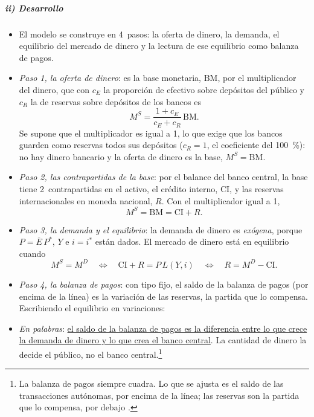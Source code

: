 \documentclass[11pt]{article}
\begin{document}
\subparagraph{ii) Desarrollo}

\begin{itemize}
\item El modelo se construye en 4~pasos: la oferta de dinero, la demanda, el equilibrio del mercado de dinero y la lectura de ese equilibrio como balanza de pagos.
\item \emph{Paso 1, la oferta de dinero}: es la base monetaria, $\mathrm{BM}$, por el multiplicador del dinero, que con $c_E$ la proporción de efectivo sobre depósitos del público y $c_R$ la de reservas sobre depósitos de los bancos es 
  \begin{equation}\label{eq:multiplicador-dinero}
  M^S=\frac{1+c_E}{c_E+c_R}\,\mathrm{BM} .
  \end{equation}
  Se supone que el multiplicador es igual a 1, lo que exige que los bancos guarden como reservas todos sus depósitos ($c_R=1$, el coeficiente del 100~\%): no hay dinero bancario y la oferta de dinero es la base, $M^S=\mathrm{BM}$.
\item \emph{Paso 2, las contrapartidas de la base}: por el balance del banco central, la base tiene 2~contrapartidas en el activo, el crédito interno, $\mathrm{CI}$, y las reservas internacionales en moneda nacional, $R$. Con el multiplicador igual a 1,
  \begin{equation}\label{eq:oferta-monetaria}
  M^S=\mathrm{BM}=\mathrm{CI}+R .
  \end{equation}
\item \emph{Paso 3, la demanda y el equilibrio}: la demanda de dinero es \emph{exógena}, porque $P=\overline E\,P^*$, $Y$ e $i=i^*$ están dados. El mercado de dinero está en equilibrio cuando
  \[
  M^S=M^D\quad\Longleftrightarrow\quad\mathrm{CI}+R=P\,L(Y,i)\quad\Longleftrightarrow\quad R=M^D-\mathrm{CI}.
  \]
\item \emph{Paso 4, la balanza de pagos}: con tipo fijo, el saldo de la balanza de pagos (por encima de la línea) es la variación de las reservas, la partida que lo compensa. Escribiendo el equilibrio en variaciones:
\item \emph{En palabras}: \uline{el saldo de la balanza de pagos es la diferencia entre lo que crece la demanda de dinero y lo que crea el banco central}. La cantidad de dinero la decide el público, no el banco central.\footnote{La balanza de pagos siempre cuadra. Lo que se ajusta es el saldo de las transacciones autónomas, por encima de la línea; las reservas son la partida que lo compensa, por debajo .}

\end{itemize}
\end{document}
